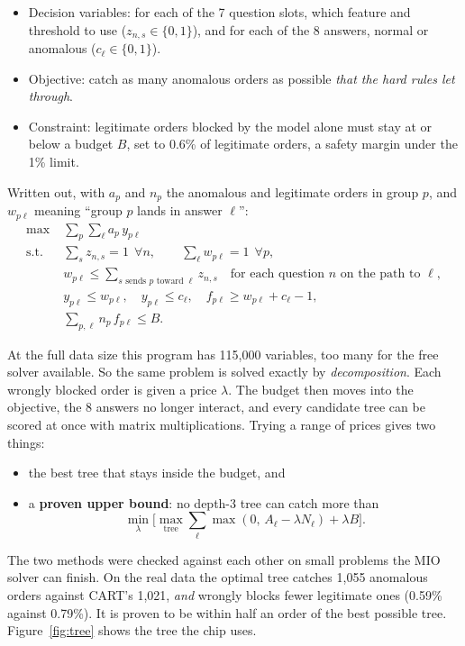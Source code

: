 \documentclass[11pt,a4paper]{article}
\begin{document}
\begin{itemize}
  \item Decision variables: for each of the 7 question slots, which feature and threshold to use
        ($z_{n,s}\in\{0,1\}$), and for each of the 8 answers, normal or anomalous ($c_\ell\in\{0,1\}$).
  \item Objective: catch as many anomalous orders as possible \emph{that the hard rules let through}.
  \item Constraint: legitimate orders blocked by the model alone must stay at or below a budget
        $B$, set to 0.6\% of legitimate orders, a safety margin under the 1\% limit.
\end{itemize}

Written out, with $a_p$ and $n_p$ the anomalous and legitimate orders in group $p$, and
$w_{p\ell}$ meaning ``group $p$ lands in answer $\ell$'':
\begin{align*}
\max\;& \textstyle\sum_{p}\sum_{\ell} a_p\, y_{p\ell} \\
\text{s.t.}\;& \textstyle\sum_s z_{n,s} = 1 \ \ \forall n, \qquad \sum_\ell w_{p\ell} = 1 \ \ \forall p,\\
& w_{p\ell} \le \textstyle\sum_{s \text{ sends } p \text{ toward } \ell} z_{n,s} \quad \text{for each question } n \text{ on the path to } \ell,\\
& y_{p\ell} \le w_{p\ell},\quad y_{p\ell} \le c_\ell,\quad f_{p\ell} \ge w_{p\ell} + c_\ell - 1,\\
& \textstyle\sum_{p,\ell} n_p\, f_{p\ell} \le B .
\end{align*}

At the full data size this program has 115{,}000 variables, too many for the free solver available.
So the same problem is solved exactly by \emph{decomposition}. Each wrongly blocked order is given
a price $\lambda$. The budget then moves into the objective, the 8 answers no longer interact, and
every candidate tree can be scored at once with matrix multiplications. Trying a range of prices
gives two things:
\begin{itemize}
  \item the best tree that stays inside the budget, and
  \item a \textbf{proven upper bound}: no depth-3 tree can catch more than
        \[ \min_\lambda \Big[\max_{\text{tree}} \sum_\ell \max(0,\, A_\ell - \lambda N_\ell) + \lambda B\Big]. \]
\end{itemize}
The two methods were checked against each other on small problems the MIO solver can finish. On the
real data the optimal tree catches 1{,}055 anomalous orders against CART's 1{,}021, \emph{and}
wrongly blocks fewer legitimate ones (0.59\% against 0.79\%). It is proven to be within half an
order of the best possible tree. Figure~\ref{fig:tree} shows the tree the chip uses.
\end{document}
